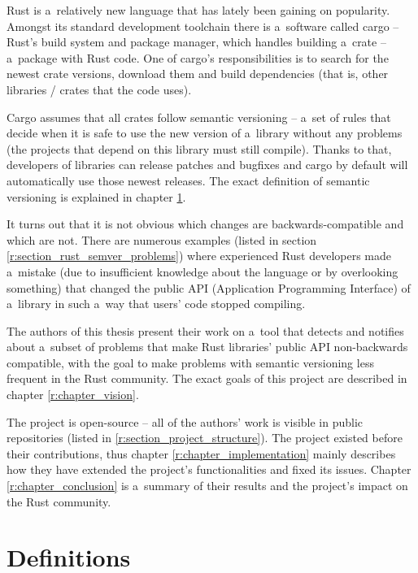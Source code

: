 \documentclass[licencjacka,en]{pracamgr}
\begin{document}
Rust is a~relatively new language that has lately been gaining on popularity. Amongst its standard
development toolchain there is a~software called cargo -- Rust's build system and package manager,
which handles building a~crate -- a~package with Rust code. One of cargo's responsibilities is to
search for the newest crate versions, download them and build dependencies (that is, other
libraries / crates that the code uses).

Cargo assumes that all crates follow semantic versioning -- a~set of rules that decide when it is
safe to use the new version of a~library without any problems (the projects that depend on this
library must still compile). Thanks to that, developers of libraries can release patches and
bugfixes and cargo by default will automatically use those newest releases. The exact definition of
semantic versioning is explained in chapter \ref{r:chapter_definitions}.

It turns out that it is not obvious which changes are backwards-compatible and which are not.
There are numerous examples (listed in section \ref{r:section_rust_semver_problems})
where experienced Rust developers made a~mistake (due to insufficient knowledge about the language
or by overlooking something) that changed the public API (Application Programming Interface)
of a~library in such a~way that users' code stopped compiling.

The authors of this thesis present their work on a~tool that detects and notifies about a~subset of
problems that make Rust libraries' public API non-backwards compatible, with the goal to make
problems with semantic versioning less frequent in the Rust community. The exact goals of this
project are described in chapter \ref{r:chapter_vision}.

The project is open-source -- all of the authors' work is visible in public repositories (listed in
\ref{r:section_project_structure}). The project existed before their contributions, thus chapter
\ref{r:chapter_implementation} mainly describes how they have extended the project's
functionalities and fixed its issues. Chapter \ref{r:chapter_conclusion} is a~summary of their
results and the project's impact on the Rust community.



\chapter{Definitions}\label{r:chapter_definitions}
\end{document}
